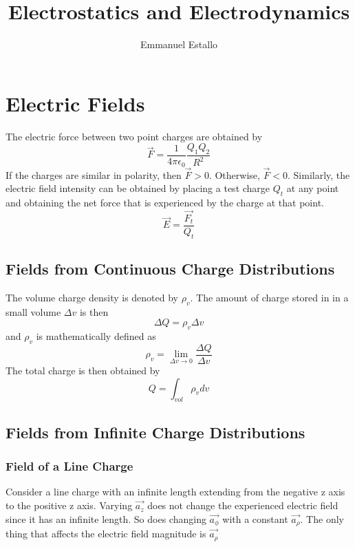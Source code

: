 \documentclass{article}
\title{Electrostatics and Electrodynamics}
\author{Emmanuel Estallo}
\begin{document}
\maketitle 
 
\section{Electric Fields}
\noindent 
The electric force between two point charges are obtained by 
$$\vec{F} = \frac{1}{4\pi\epsilon_0}\frac{Q_1 Q_2}{R^2}$$
If the charges are similar in polarity, then $\vec{F}> 0$. Otherwise, 
$\vec{F} < 0$.
Similarly, the electric field intensity can be obtained by placing a test charge $Q_t$ 
at any point and obtaining the net force that is experienced by the charge at that point.
$$\vec{E} = \frac{\vec{F_t}}{Q_t}$$

\subsection{Fields from Continuous Charge Distributions}
The volume charge density is denoted by $\rho_v$. The amount of charge stored in 
in a small volume $\Delta{v}$ is then $$\Delta{Q} = \rho_v \Delta{v}$$ and $\rho_v$
is mathematically defined as $$\rho_v = \lim_{\Delta{v}\to 0} 
\frac{\Delta{Q}}{\Delta{v}}$$ The total charge is then obtained by 
$$Q = \int_{vol} \rho_v dv$$

\subsection{Fields from Infinite Charge Distributions}
\subsubsection{Field of a Line Charge}
\noindent 
Consider a line charge with an infinite length extending from the negative z axis 
to the positive z axis. Varying $\vec{a_z}$ does not change the 
experienced electric field since it has an infinite length. So does changing 
$\vec{a_\phi}$ with a constant $\vec{a_\rho}$. The only thing that affects the
electric field magnitude is $\vec{a_\rho}$ 
\end{document}
